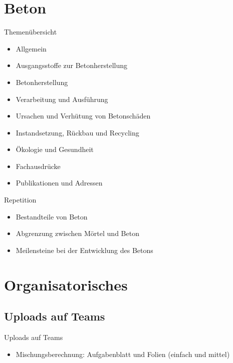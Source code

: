 \section{Beton}
\BlueSectionSlide

\begin{frame}{Themenübersicht}
    \begin{itemize}
        \item Allgemein
        \item Ausgangsstoffe zur Betonherstellung
        \item Betonherstellung
        \item Verarbeitung und Ausführung
        \item Ursachen und Verhütung von Betonschäden
        \item Instandsetzung, Rückbau und Recycling
        \item Ökologie und Gesundheit
        \item Fachausdrücke
        \item Publikationen und Adressen
    \end{itemize}
\end{frame}

\begin{frame}{Repetition}
    \begin{itemize}
        \item Bestandteile von Beton
        \item Abgrenzung zwischen Mörtel und Beton
        \item Meilensteine bei der Entwicklung des Betons
    \end{itemize}

\end{frame}



\section{Organisatorisches}
\BlueSectionSlide

\subsection{Uploads auf Teams}
\begin{frame}{Uploads auf Teams}
    \begin{itemize}
        \item[\textbullet] Mischungsberechnung: Aufgabenblatt und Folien (einfach und mittel)
    \end{itemize}

\end{frame}

